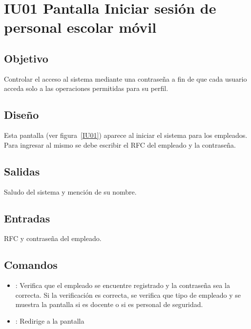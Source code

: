 
\section{IU01 Pantalla Iniciar sesión de personal escolar móvil}

\subsection{Objetivo}
	Controlar el acceso al sistema mediante una contraseña a fin de que cada usuario acceda solo a las operaciones permitidas para su perfil.

\subsection{Diseño}
	Esta pantalla  (ver figura~\ref{IU01}) aparece al iniciar el sistema para los empleados. Para ingresar al mismo se debe escribir el RFC del empleado y la contraseña. 


\subsection{Salidas}

Saludo del sistema y mención de su nombre.

\subsection{Entradas}
RFC y contraseña del empleado.

\subsection{Comandos}
\begin{itemize}
	\item {}: Verifica que el empleado se encuentre registrado y la contraseña sea la correcta. Si la verificación es correcta, se verifica que tipo de empleado y se muestra la pantalla  si es docente o  si es personal de seguridad.
	
	\item {}: Redirige a la pantalla 
	
\end{itemize}

